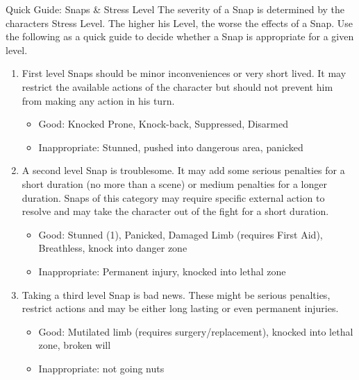 \begin{DndSidebar}{Quick Guide: Snaps \& Stress Level}
The severity of a Snap is determined by the characters Stress Level.
The higher his Level, the worse the effects of a Snap.
Use the following as a quick guide to decide whether a Snap is appropriate for a given level.
\begin{enumerate}
	\item First level Snaps should be minor inconveniences or very short lived. It may restrict the available actions of the character but should not prevent him from making any action in his turn.
	\begin{itemize}
		\item Good: Knocked Prone, Knock-back, Suppressed, Disarmed
		\item Inappropriate: Stunned, pushed into dangerous area, panicked
	\end{itemize}
	\item A second level Snap is troublesome. It may add some serious penalties for a short duration (no more than a scene) or medium penalties for a longer duration. Snaps of this category may require specific external action to resolve and may take the character out of the fight for a short duration.
	\begin{itemize}
		\item Good: Stunned (1), Panicked, Damaged Limb (requires First Aid), Breathless, knock into danger zone
		\item Inappropriate: Permanent injury, knocked into lethal zone
	\end{itemize}
	\item Taking a third level Snap is bad news. These might be serious penalties, restrict actions and may be either long lasting or even permanent injuries.
	\begin{itemize}
		\item Good: Mutilated limb (requires surgery/replacement), knocked into lethal zone, broken will
		\item Inappropriate: not going nuts
	\end{itemize}
\end{enumerate}
\end{DndSidebar}

